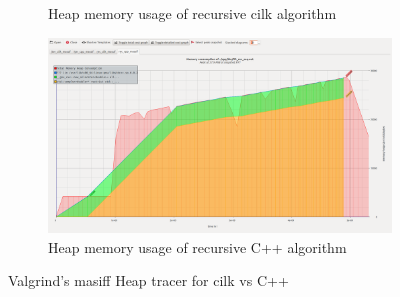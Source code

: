 \begin{landscape}
\begin{figure}
\begin{subfigure}[b]{0.65\textwidth}
            \caption{Heap memory usage of recursive cilk algorithm}
            \label{fig:heap_rec_cilk}
        \end{subfigure}%
        \begin{subfigure}[b]{0.65\textwidth}
            \center
            \includegraphics[width=\textwidth]{img/fft_rec_cpp.png}
            \caption{Heap memory usage of recursive C++ algorithm}
            \label{fig:heap_rec_cpp}
        \end{subfigure}
        \caption{Valgrind's masiff Heap tracer for cilk vs C++}\label{fig:masiff}
\end{figure}
\end{landscape}